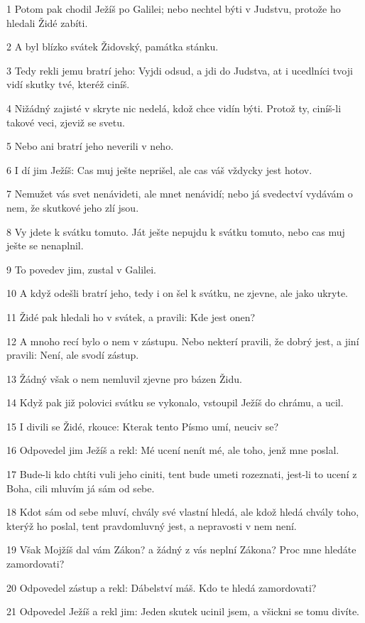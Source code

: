 \par 1 Potom pak chodil Ježíš po Galilei; nebo nechtel býti v Judstvu, protože ho hledali Židé zabíti.
\par 2 A byl blízko svátek Židovský, památka stánku.
\par 3 Tedy rekli jemu bratrí jeho: Vyjdi odsud, a jdi do Judstva, at i ucedlníci tvoji vidí skutky tvé, kteréž ciníš.
\par 4 Nižádný zajisté v skryte nic nedelá, kdož chce vidín býti. Protož ty, ciníš-li takové veci, zjeviž se svetu.
\par 5 Nebo ani bratrí jeho neverili v neho.
\par 6 I dí jim Ježíš: Cas muj ješte neprišel, ale cas váš vždycky jest hotov.
\par 7 Nemužet vás svet nenávideti, ale mnet nenávidí; nebo já svedectví vydávám o nem, že skutkové jeho zlí jsou.
\par 8 Vy jdete k svátku tomuto. Ját ješte nepujdu k svátku tomuto, nebo cas muj ješte se nenaplnil.
\par 9 To povedev jim, zustal v Galilei.
\par 10 A když odešli bratrí jeho, tedy i on šel k svátku, ne zjevne, ale jako ukryte.
\par 11 Židé pak hledali ho v svátek, a pravili: Kde jest onen?
\par 12 A mnoho recí bylo o nem v zástupu. Nebo nekterí pravili, že dobrý jest, a jiní pravili: Není, ale svodí zástup.
\par 13 Žádný však o nem nemluvil zjevne pro bázen Židu.
\par 14 Když pak již polovici svátku se vykonalo, vstoupil Ježíš do chrámu, a ucil.
\par 15 I divili se Židé, rkouce: Kterak tento Písmo umí, neuciv se?
\par 16 Odpovedel jim Ježíš a rekl: Mé ucení nenít mé, ale toho, jenž mne poslal.
\par 17 Bude-li kdo chtíti vuli jeho ciniti, tent bude umeti rozeznati, jest-li to ucení z Boha, cili mluvím já sám od sebe.
\par 18 Kdot sám od sebe mluví, chvály své vlastní hledá, ale kdož hledá chvály toho, kterýž ho poslal, tent pravdomluvný jest, a nepravosti v nem není.
\par 19 Však Mojžíš dal vám Zákon? a žádný z vás neplní Zákona? Proc mne hledáte zamordovati?
\par 20 Odpovedel zástup a rekl: Dábelství máš. Kdo te hledá zamordovati?
\par 21 Odpovedel Ježíš a rekl jim: Jeden skutek ucinil jsem, a všickni se tomu divíte.
